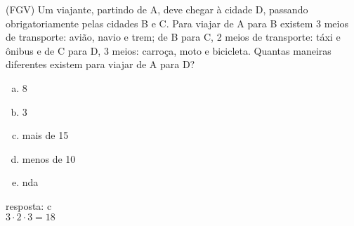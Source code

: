 \begin{ex}
(FGV) Um viajante, partindo de A, deve chegar à cidade D, passando obrigatoriamente pelas cidades B e C. Para viajar de A para B existem 3 meios de transporte: avião, navio e trem; de B para C, 2 meios de transporte: táxi e ônibus e de C para D, 3 meios: carroça, moto e bicicleta. Quantas maneiras diferentes existem para viajar de A para D?
   \begin{enumerate}[(a)]
   \item 8
   \item 3
   \item mais de 15
   \item menos de 10
   \item nda
   \end{enumerate}
     \begin{sol}
       resposta: c \\
       $3\cdot2\cdot3=18$
     \end{sol}
\end{ex}